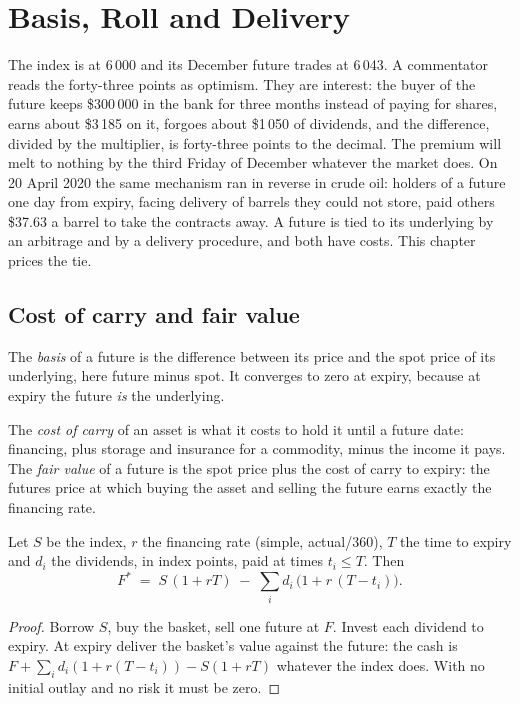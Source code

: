 \chapter{Basis, Roll and Delivery}\label{ch:m1:basis-roll-and-delivery}

The index is at 6\,000 and its December future trades at 6\,043. A
commentator reads the forty-three points as optimism. They are interest: the
buyer of the future keeps \$300\,000 in the bank for three months instead of
paying for shares, earns about \$3\,185 on it, forgoes about \$1\,050 of
dividends, and the difference, divided by the multiplier, is forty-three
points to the decimal. The premium will melt to nothing by the third Friday of
December whatever the market does. On 20 April 2020 the same mechanism ran
in reverse in crude oil: holders of a future one day from expiry, facing
delivery of barrels they could not store, paid others \$37.63 a barrel to take
the contracts away. A future is tied to its underlying by an arbitrage and by
a delivery procedure, and both have costs. This chapter prices the tie.

\section{Cost of carry and fair value}

\begin{definition}[Basis]\label{def:m1:basis-roll-and-delivery:basis}
The \emph{basis} of a future is the difference between its price
and the spot price of its underlying, here future minus spot. It converges to
zero at expiry, because at expiry the future \emph{is} the underlying.
\end{definition}

\begin{definition}\label{def:m1:basis-roll-and-delivery:carry}
The \emph{cost of carry} of an asset is what it costs to
hold it until a future date: financing, plus storage and insurance for a
commodity, minus the income it pays. The \emph{fair value}
of a future is the spot price plus the cost of carry to expiry: the futures
price at which buying the asset and selling the future earns exactly the
financing rate.
\end{definition}

\begin{proposition}\label{prop:m1:basis-roll-and-delivery:fv}
Let $S$ be the index, $r$ the financing rate (simple, actual/360), $T$ the
time to expiry and $d_i$ the dividends, in index points, paid at times $t_i
\le T$. Then
\[
F^* \;=\; S\,(1 + rT) \;-\; \sum_i d_i\,\bigl(1 + r\,(T - t_i)\bigr).
\]
\end{proposition}
\begin{proof}
Borrow $S$, buy the basket, sell one future at $F$. Invest each dividend to
expiry. At expiry deliver the basket's value against the future: the cash is
$F + \sum_i d_i(1 + r(T-t_i)) - S(1+rT)$ whatever the index does. With no
initial outlay and no risk it must be zero.
\end{proof}

